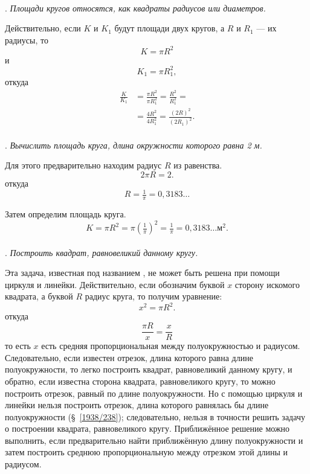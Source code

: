 \paragraph{}\label{1938/265}
.
\emph{Площади кругов относятся, как квадраты радиусов или диаметров.}

Действительно, если $K$ и $K_1$ будут площади двух кругов, а $R$ и $R_1$ — их радиусы, то
\[K=\pi R^2\]
и
\[K_1=\pi R_1^2,\]
откуда
\begin{align*}
\frac{K}{K_1}&=\frac{\pi R^2}{\pi R^2_1}=\frac{R^2}{R^2_1}=
\\
&=\frac{4R^2}{4R^2_1}=\frac{(2R)^2}{(2R_1)^2}.
\end{align*}


\paragraph{}\label{1938/266}
.
\emph{Вычислить площадь круга, длина окружности которого равна 2 м.}

Для этого предварительно находим радиус $R$ из равенства.
\[2\pi R= 2.\]
откуда
\[R=\tfrac1\pi=0{,}3183\dots\]

Затем определим площадь круга.
\[K=\pi R^2=\pi(\tfrac1\pi)^2=\tfrac1\pi=0{,}3183\dots\text{м}^2.\]

\paragraph{}\label{1938/267}
.
\emph{Построить квадрат, равновеликий данному кругу.}

Эта задача, известная под названием , не может быть решена при помощи циркуля и линейки.
Действительно, если обозначим буквой $x$ сторону искомого квадрата, а буквой $R$ радиус круга, то получим уравнение:
\[x^2=\pi R^2.\]
откуда
\[\frac{\pi R}{x}=\frac{x}{R}\]
то есть
$x$ есть средняя пропорциональная между полуокружностью и радиусом.
Следовательно, если известен отрезок, длина которого равна длине полуокружности, то легко построить квадрат, равновеликий данному кругу, и обратно, если известна сторона квадрата, равновеликого кругу, то можно построить отрезок, равный по длине полуокружности.
Но с помощью циркуля и линейки нельзя построить отрезок, длина которого равнялась бы длине полуокружности (§~\ref{1938/238});
следовательно, нельзя в точности решить задачу о построении квадрата, равновеликого кругу.
Приближённое решение можно выполнить, если предварительно найти приближённую длину полуокружности и затем построить среднюю пропорциональную между отрезком этой длины и радиусом.

